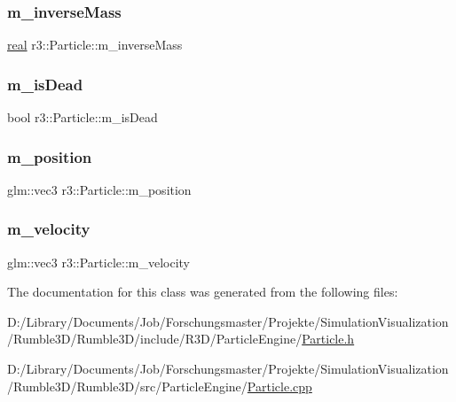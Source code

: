\subsubsection{\texorpdfstring{m\+\_\+inverse\+Mass}{m\_inverseMass}}
{\footnotesize\ttfamily \mbox{\hyperlink{namespacer3_ab2016b3e3f743fb735afce242f0dc1eb}{real}} r3\+::\+Particle\+::m\+\_\+inverse\+Mass\hspace{0.3cm}{\ttfamily [protected]}}

\mbox{\label{classr3_1_1_particle_a0a04ce870abc9017f09c2564344fda82}} 
\subsubsection{\texorpdfstring{m\+\_\+is\+Dead}{m\_isDead}}
{\footnotesize\ttfamily bool r3\+::\+Particle\+::m\+\_\+is\+Dead\hspace{0.3cm}{\ttfamily [protected]}}

\mbox{\label{classr3_1_1_particle_ab7f5aa7cf48278441aab18db1a0c1ba9}} 
\subsubsection{\texorpdfstring{m\+\_\+position}{m\_position}}
{\footnotesize\ttfamily glm\+::vec3 r3\+::\+Particle\+::m\+\_\+position\hspace{0.3cm}{\ttfamily [protected]}}

\mbox{\label{classr3_1_1_particle_a037d73e42df0c7bb9f1ae79b37301477}} 
\subsubsection{\texorpdfstring{m\+\_\+velocity}{m\_velocity}}
{\footnotesize\ttfamily glm\+::vec3 r3\+::\+Particle\+::m\+\_\+velocity\hspace{0.3cm}{\ttfamily [protected]}}



The documentation for this class was generated from the following files\+:\begin{DoxyCompactItemize}
\item 
D\+:/\+Library/\+Documents/\+Job/\+Forschungsmaster/\+Projekte/\+Simulation\+Visualization/\+Rumble3\+D/\+Rumble3\+D/include/\+R3\+D/\+Particle\+Engine/\mbox{\hyperlink{_particle_8h}{Particle.\+h}}\item 
D\+:/\+Library/\+Documents/\+Job/\+Forschungsmaster/\+Projekte/\+Simulation\+Visualization/\+Rumble3\+D/\+Rumble3\+D/src/\+Particle\+Engine/\mbox{\hyperlink{_particle_8cpp}{Particle.\+cpp}}\end{DoxyCompactItemize}
